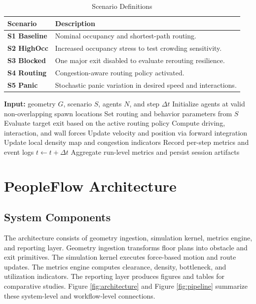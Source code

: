 \documentclass[journal]{IEEEtran}
\begin{document}
\begin{table}[t]
\centering
\caption{Scenario Definitions}
\label{tab:scenarios}
{\footnotesize
\setlength{\tabcolsep}{3pt}
\begin{tabular}{>{\bfseries}p{1.55cm} p{5.10cm}}
\toprule
Scenario & Description \\
\midrule
S1 Baseline & Nominal occupancy and shortest-path routing. \\
S2 HighOcc & Increased occupancy stress to test crowding sensitivity. \\
S3 Blocked & One major exit disabled to evaluate rerouting resilience. \\
S4 Routing & Congestion-aware routing policy activated. \\
S5 Panic & Stochastic panic variation in desired speed and interactions. \\
\bottomrule
\end{tabular}
}
\end{table}

\begin{algorithm}[t]
\caption{PeopleFlow Simulation Loop}
\label{alg:simloop}
\begin{algorithmic}[1]
\STATE \textbf{Input:} geometry $G$, scenario $S$, agents $N$, and step $\Delta t$
\STATE Initialize agents at valid non-overlapping spawn locations
\STATE Set routing and behavior parameters from $S$
        \STATE Evaluate target exit based on the active routing policy
        \STATE Compute driving, interaction, and wall forces
        \STATE Update velocity and position via forward integration
    \ENDFOR
    \STATE Update local density map and congestion indicators
    \STATE Record per-step metrics and event logs
    \STATE $t \leftarrow t + \Delta t$
\ENDWHILE
\STATE Aggregate run-level metrics and persist session artifacts
\end{algorithmic}
\end{algorithm}

\section{PeopleFlow Architecture}
\subsection{System Components}
The architecture consists of geometry ingestion, simulation kernel, metrics engine, and reporting layer. Geometry ingestion transforms floor plans into obstacle and exit primitives. The simulation kernel executes force-based motion and route updates. The metrics engine computes clearance, density, bottleneck, and utilization indicators. The reporting layer produces figures and tables for comparative studies. Figure \ref{fig:architecture} and Figure \ref{fig:pipeline} summarize these system-level and workflow-level connections.
\end{document}

